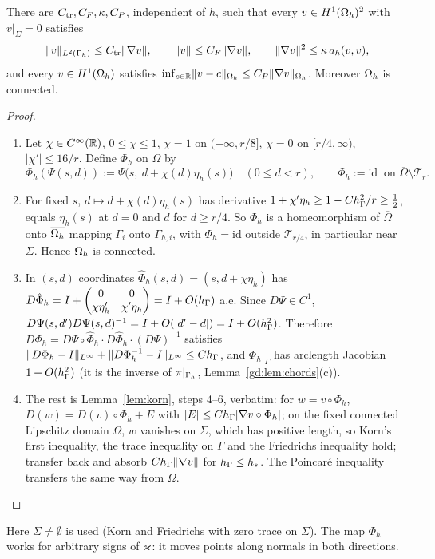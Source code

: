 \begin{lemma}\label{gd:lem:korn}
There are $C_{\rm tr},C_F,\kappa,C_P$, independent of $h$, such that every $v\in H^1(\Omega_h)^2$ with $v|_\Sigma=0$ satisfies
\[
\lVert v\rVert_{L^2(\Gamma_h)}\le C_{\rm tr}\lVert \nabla v\rVert,\qquad\lVert v\rVert\le C_F\lVert \nabla v\rVert,\qquad\lVert \nabla v\rVert^2\le\kappa\,a_h(v,v),
\]
and every $v\in H^1(\Omega_h)$ satisfies $\inf_{c\in\mathbb R}\lVert v-c\rVert_{\Omega_h}\le C_P\lVert \nabla v\rVert_{\Omega_h}$. Moreover $\Omega_h$ is connected.
\end{lemma}

\begin{proof}
\begin{enumerate}
\item Let $\chi\in C^\infty(\mathbb R)$, $0\le\chi\le1$, $\chi=1$ on $(-\infty,r/8]$, $\chi=0$ on $[r/4,\infty)$, $|\chi'|\le16/r$. Define $\Phi_h$ on $\overline\Omega$ by
\[
\Phi_h(\Psi(s,d)):=\Psi\bigl(s,\ d+\chi(d)\eta_h(s)\bigr)\quad(0\le d<r),\qquad\Phi_h:=\mathrm{id}\ \text{ on }\overline\Omega\setminus\mathcal T_r .
\]
\item For fixed $s$, $d\mapsto d+\chi(d)\eta_h(s)$ has derivative $1+\chi'\eta_h\ge1-Ch_\Gamma^2/r\ge\frac12$, equals $\eta_h(s)$ at $d=0$ and $d$ for $d\ge r/4$. So $\Phi_h$ is a homeomorphism of $\overline\Omega$ onto $\overline{\Omega_h}$ mapping $\Gamma_i$ onto $\Gamma_{h,i}$, with $\Phi_h=\mathrm{id}$ outside $\mathcal T_{r/4}$, in particular near $\Sigma$. Hence $\Omega_h$ is connected.
\item In $(s,d)$ coordinates $\hat\Phi_h(s,d)=(s,d+\chi\eta_h)$ has $D\hat\Phi_h=I+\begin{pmatrix}0&0\\\chi\eta_h'&\chi'\eta_h\end{pmatrix}=I+O(h_\Gamma)$ a.e. Since $D\Psi\in C^1$, $D\Psi(s,d')D\Psi(s,d)^{-1}=I+O(|d'-d|)=I+O(h_\Gamma^2)$. Therefore $D\Phi_h=D\Psi\circ\hat\Phi_h\cdot D\hat\Phi_h\cdot(D\Psi)^{-1}$ satisfies $\lVert D\Phi_h-I\rVert_{L^\infty}+\lVert D\Phi_h^{-1}-I\rVert_{L^\infty}\le Ch_\Gamma$, and $\Phi_h|_\Gamma$ has arclength Jacobian $1+O(h_\Gamma^2)$ (it is the inverse of $\pi|_{\Gamma_h}$, Lemma~\ref{gd:lem:chords}(c)).
\item The rest is Lemma~\ref{lem:korn}, steps 4--6, verbatim: for $w=v\circ\Phi_h$, $D(w)=D(v)\circ\Phi_h+E$ with $|E|\le Ch_\Gamma|\nabla v\circ\Phi_h|$; on the fixed connected Lipschitz domain $\Omega$, $w$ vanishes on $\Sigma$, which has positive length, so Korn's first inequality, the trace inequality on $\Gamma$ and the Friedrichs inequality hold; transfer back and absorb $Ch_\Gamma\lVert \nabla v\rVert$ for $h_\Gamma\le h_\ast$. The Poincar\'e inequality transfers the same way from $\Omega$.\qedhere
\end{enumerate}
\end{proof}
Here $\Sigma\ne\emptyset$ is used (Korn and Friedrichs with zero trace on $\Sigma$). The map $\Phi_h$ works for arbitrary signs of $\varkappa$: it moves points along normals in both directions.

